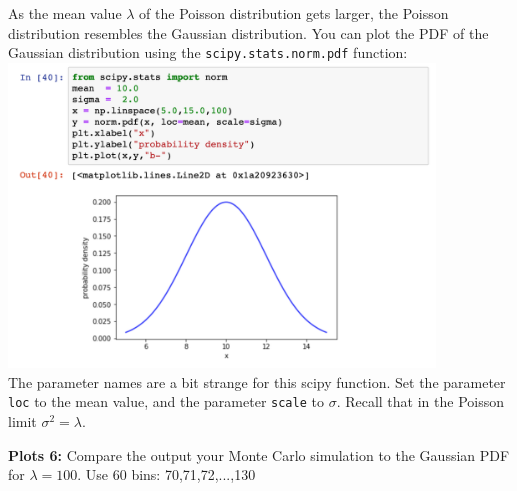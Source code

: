 As the mean value $\lambda$ of the Poisson distribution gets larger, the Poisson distribution resembles the Gaussian distribution.  You can plot the PDF of the Gaussian distribution using the {\tt scipy.stats.norm.pdf} function:\\
\includegraphics[width=0.85\textwidth]{figs/labs/distributions/plotgauss.png}\\
The parameter names are a bit strange for this scipy function.  Set the parameter {\tt loc} to the mean value, and the parameter {\tt scale} to $\sigma$.  Recall that in the Poisson limit $\sigma^2 = \lambda$.

{\bf Plots 6:} Compare the output your Monte Carlo simulation to the Gaussian PDF for $\lambda = 100$.  Use 60 bins:  70,71,72,...,130

















